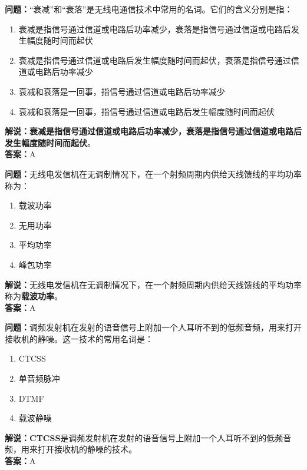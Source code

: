 \textbf{问题：}“衰减”和“衰落”是无线电通信技术中常用的名词。它们的含义分别是指：

\begin{enumerate}[label=\Alph*), leftmargin=1cm]
	\item 衰减是指信号通过信道或电路后功率减少，衰落是指信号通过信道或电路后发生幅度随时间而起伏
	\item 衰减是指信号通过信道或电路后发生幅度随时间而起伏，衰落是指信号通过信道或电路后功率减少
	\item 衰减和衰落是一回事，指信号通过信道或电路后功率减少
	\item 衰减和衰落是一回事，指信号通过信道或电路后发生幅度随时间而起伏
\end{enumerate}

\textbf{解说：}\textbf{衰减是指信号通过信道或电路后功率减少，衰落是指信号通过信道或电路后发生幅度随时间而起伏}。\\\textbf{答案：}A%



\textbf{问题：}无线电发信机在无调制情况下，在一个射频周期内供给天线馈线的平均功率称为：

\begin{enumerate}[label=\Alph*), leftmargin=1cm]
	\item 载波功率
	\item 无用功率
	\item 平均功率
	\item 峰包功率
\end{enumerate}

\textbf{解说：}无线电发信机在无调制情况下，在一个射频周期内供给天线馈线的平均功率称为\textbf{载波功率}。\\\textbf{答案：}A%



\textbf{问题：}调频发射机在发射的语音信号上附加一个人耳听不到的低频音频，用来打开接收机的静噪。这一技术的常用名词是：

\begin{enumerate}[label=\Alph*), leftmargin=1cm]
	\item CTCSS
	\item 单音频脉冲
	\item DTMF
	\item 载波静噪
\end{enumerate}

\textbf{解说：}\textbf{CTCSS}是调频发射机在发射的语音信号上附加一个人耳听不到的低频音频，用来打开接收机的静噪的技术。\\\textbf{答案：}A%



